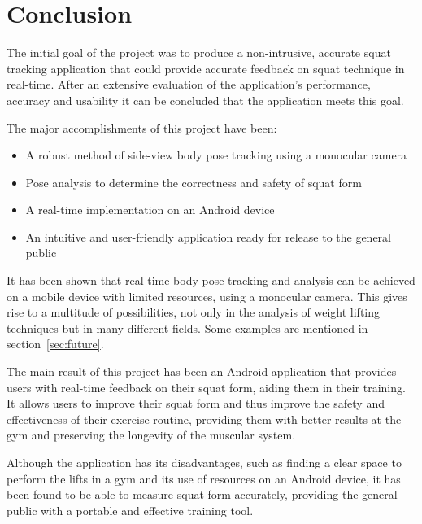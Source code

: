 \section{Conclusion}

The initial goal of the project was to produce a non-intrusive, accurate squat tracking application that could provide accurate feedback on squat technique in real-time. After an extensive evaluation of the application's performance, accuracy and usability it can be concluded that the application meets this goal.

The major accomplishments of this project have been:

\begin{itemize}
	\item A robust method of side-view body pose tracking using a monocular camera
	\item Pose analysis to determine the correctness and safety of squat form
	\item A real-time implementation on an Android device
	\item An intuitive and user-friendly application ready for release to the general public
\end{itemize}

It has been shown that real-time body pose tracking and analysis can be achieved on a mobile device with limited resources, using a monocular camera. This gives rise to a multitude of possibilities, not only in the analysis of weight lifting techniques but in many different fields. Some examples are mentioned in section~\ref{sec:future}.

The main result of this project has been an Android application that provides users with real-time feedback on their squat form, aiding them in their training. It allows users to improve their squat form and thus improve the safety and effectiveness of their exercise routine, providing them with better results at the gym and preserving the longevity of the muscular system.

Although the application has its disadvantages, such as finding a clear space to perform the lifts in a gym and its use of resources on an Android device, it has been found to be able to measure squat form accurately, providing the general public with a portable and effective training tool.
